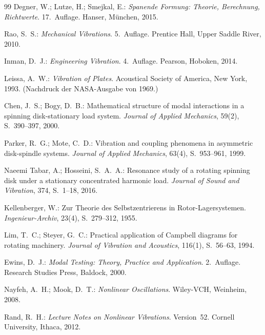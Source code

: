 ﻿\documentclass[a4paper,12pt]{article}
\theoremstyle{definition}
\begin{document}
\begin{thebibliography}{99}
Degner, W.; Lutze, H.; Smejkal, E.:
\textit{Spanende Formung: Theorie, Berechnung, Richtwerte}.
17.~Auflage. Hanser, M{\"u}nchen, 2015.
 
 
Rao, S.~S.:
\textit{Mechanical Vibrations}.
5.~Auflage. Prentice Hall, Upper Saddle River, 2010.
 
Inman, D.~J.:
\textit{Engineering Vibration}.
4.~Auflage. Pearson, Hoboken, 2014.
 
Leissa, A.~W.:
\textit{Vibration of Plates}.
Acoustical Society of America, New York, 1993.
(Nachdruck der NASA-Ausgabe von 1969.)
 
Chen, J.~S.; Bogy, D.~B.:
Mathematical structure of modal interactions in a spinning disk-stationary load system.
\textit{Journal of Applied Mechanics}, 59(2), S.~390--397, 2000.
 
Parker, R.~G.; Mote, C.~D.:
Vibration and coupling phenomena in asymmetric disk-spindle systems.
\textit{Journal of Applied Mechanics}, 63(4), S.~953--961, 1999.
 
Naeemi Tabar, A.; Hosseini, S.~A.~A.:
Resonance study of a rotating spinning disk under a stationary concentrated harmonic load.
\textit{Journal of Sound and Vibration}, 374, S.~1--18, 2016.
 
Kellenberger, W.:
Zur Theorie des Selbstzentrierens in Rotor-Lagersystemen.
\textit{Ingenieur-Archiv}, 23(4), S.~279--312, 1955.
 
 
Lim, T.~C.; Steyer, G.~C.:
Practical application of Campbell diagrams for rotating machinery.
\textit{Journal of Vibration and Acoustics}, 116(1), S.~56--63, 1994.
 
Ewins, D.~J.:
\textit{Modal Testing: Theory, Practice and Application}.
2.~Auflage. Research Studies Press, Baldock, 2000.
 
Nayfeh, A.~H.; Mook, D.~T.:
\textit{Nonlinear Oscillations}.
Wiley-VCH, Weinheim, 2008.
 
Rand, R.~H.:
\textit{Lecture Notes on Nonlinear Vibrations}.
Version~52. Cornell University, Ithaca, 2012.
 

\end{thebibliography}
\end{document}
